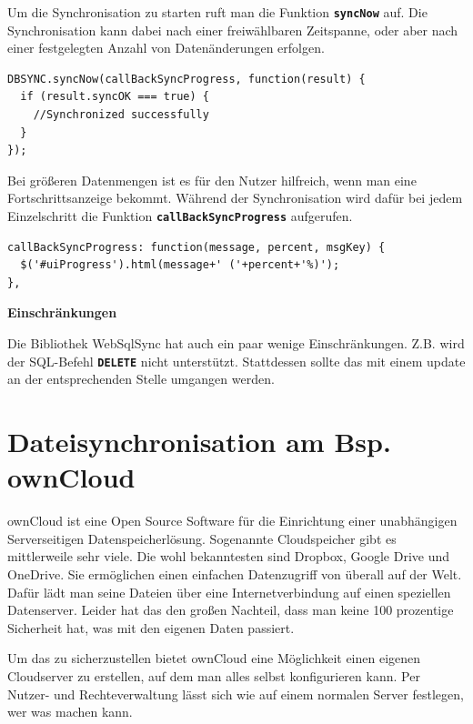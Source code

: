 Um die Synchronisation zu starten ruft man die Funktion \textbf{\lstinline$syncNow$} auf. Die Synchronisation kann dabei nach einer freiwählbaren Zeitspanne, oder aber nach einer festgelegten Anzahl von Datenänderungen erfolgen.

\lstset{language=html}
\begin{lstlisting}
DBSYNC.syncNow(callBackSyncProgress, function(result) {
  if (result.syncOK === true) {
    //Synchronized successfully
  }
});
\end{lstlisting}

Bei größeren Datenmengen ist es für den Nutzer hilfreich, wenn man eine Fortschrittsanzeige bekommt. Während der Synchronisation wird dafür bei jedem Einzelschritt die Funktion \textbf{\lstinline$callBackSyncProgress$} aufgerufen.

\lstset{language=html}
\begin{lstlisting}
callBackSyncProgress: function(message, percent, msgKey) {
  $('#uiProgress').html(message+' ('+percent+'%)');
},
\end{lstlisting}

\textbf{Einschränkungen}

Die Bibliothek WebSqlSync hat auch ein paar wenige Einschränkungen. Z.B. wird der \ac{SQL}-Befehl \textbf{\lstinline$DELETE$} nicht unterstützt. Stattdessen sollte das mit einem update an der entsprechenden Stelle umgangen werden.

\section{Dateisynchronisation am Bsp. ownCloud}
\label{sec:datasync}

ownCloud ist eine Open Source Software für die Einrichtung einer unabhängigen Serverseitigen Datenspeicherlösung. Sogenannte Cloudspeicher gibt es mittlerweile sehr viele. Die wohl bekanntesten sind Dropbox, Google Drive und OneDrive. Sie ermöglichen einen einfachen Datenzugriff von überall auf der Welt. Dafür lädt man seine Dateien über eine Internetverbindung auf einen speziellen Datenserver. Leider hat das den großen Nachteil, dass man keine 100 prozentige Sicherheit hat, was mit den eigenen Daten passiert.

Um das zu sicherzustellen bietet ownCloud eine Möglichkeit einen eigenen Cloudserver zu erstellen, auf dem man alles selbst konfigurieren kann. Per Nutzer- und Rechteverwaltung lässt sich wie auf einem normalen Server festlegen, wer was machen kann. 

